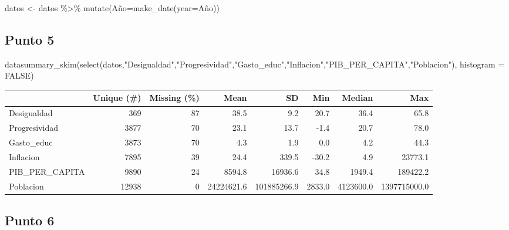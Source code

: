\documentclass[
]{article}
\newenvironment{Shaded}{\begin{snugshade}}{\end{snugshade}}
\newcommand{\AttributeTok}[1]{\textcolor[rgb]{0.77,0.63,0.00}{#1}}
\newcommand{\ConstantTok}[1]{\textcolor[rgb]{0.00,0.00,0.00}{#1}}
\newcommand{\FunctionTok}[1]{\textcolor[rgb]{0.00,0.00,0.00}{#1}}
\newcommand{\NormalTok}[1]{#1}
\newcommand{\OtherTok}[1]{\textcolor[rgb]{0.56,0.35,0.01}{#1}}
\newcommand{\SpecialCharTok}[1]{\textcolor[rgb]{0.00,0.00,0.00}{#1}}
\newcommand{\StringTok}[1]{\textcolor[rgb]{0.31,0.60,0.02}{#1}}
\begin{document}
\begin{Shaded}
\begin{Highlighting}[]
\NormalTok{datos }\OtherTok{\textless{}{-}}\NormalTok{ datos }\SpecialCharTok{\%\textgreater{}\%}  \FunctionTok{mutate}\NormalTok{(Año}\OtherTok{=}\FunctionTok{make\_date}\NormalTok{(}\AttributeTok{year=}\NormalTok{Año))}
\end{Highlighting}
\end{Shaded}

\hypertarget{punto-5}{%
\subsection{Punto 5}\label{punto-5}}

\begin{Shaded}
\begin{Highlighting}[]
  \FunctionTok{datasummary\_skim}\NormalTok{(}\FunctionTok{select}\NormalTok{(datos,}\StringTok{"Desigualdad"}\NormalTok{,}\StringTok{"Progresividad"}\NormalTok{,}\StringTok{"Gasto\_educ"}\NormalTok{,}\StringTok{"Inflacion"}\NormalTok{,}\StringTok{"PIB\_PER\_CAPITA"}\NormalTok{,}\StringTok{"Poblacion"}\NormalTok{), }\AttributeTok{histogram =} \ConstantTok{FALSE}\NormalTok{)}
\end{Highlighting}
\end{Shaded}

\begin{table}
\centering
\begin{tabular}[t]{lrrrrrrr}
\toprule
  & Unique (\#) & Missing (\%) & Mean & SD & Min & Median & Max\\
\midrule
Desigualdad & 369 & 87 & 38.5 & 9.2 & 20.7 & 36.4 & 65.8\\
Progresividad & 3877 & 70 & 23.1 & 13.7 & -1.4 & 20.7 & 78.0\\
Gasto\_educ & 3873 & 70 & 4.3 & 1.9 & 0.0 & 4.2 & 44.3\\
Inflacion & 7895 & 39 & 24.4 & 339.5 & -30.2 & 4.9 & 23773.1\\
PIB\_PER\_CAPITA & 9890 & 24 & 8594.8 & 16936.6 & 34.8 & 1949.4 & 189422.2\\
Poblacion & 12938 & 0 & 24224621.6 & 101885266.9 & 2833.0 & 4123600.0 & 1397715000.0\\
\bottomrule
\end{tabular}
\end{table}

\hypertarget{punto-6}{%
\subsection{Punto 6}\label{punto-6}}
\end{document}
